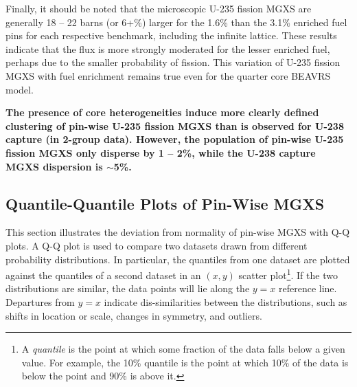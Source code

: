 Finally, it should be noted that the microscopic U-235 fission \ac{MGXS} are generally 18 -- 22 barns (or 6+\%) larger for the 1.6\% than the 3.1\% enriched fuel pins for each respective benchmark, including the infinite lattice. These results indicate that the flux is more strongly moderated for the lesser enriched fuel, perhaps due to the smaller probability of fission. This variation of U-235 fission \ac{MGXS} with fuel enrichment remains true even for the quarter core \ac{BEAVRS} model. 

\begin{emphbox}
\textbf{The presence of core heterogeneities induce more clearly defined clustering of pin-wise U-235 fission \ac{MGXS} than is observed for U-238 capture (in 2-group data). However, the population of pin-wise U-235 fission \ac{MGXS} only disperse by 1 -- 2\%, while the U-238 capture \ac{MGXS} dispersion is $\sim$5\%.}
\end{emphbox}

\subsection{Quantile-Quantile Plots of Pin-Wise MGXS}
\label{subsec:chap9-qq-plots}

This section illustrates the deviation from normality of pin-wise \ac{MGXS} with \ac{Q-Q} plots. A \ac{Q-Q} plot is used to compare two datasets drawn from different probability distributions. In particular, the quantiles from one dataset are plotted against the quantiles of a second dataset in an $(x,y)$ scatter plot\footnote{A \textit{quantile} is the point at which some fraction of the data falls below a given value. For example, the 10\% quantile is the point at which 10\% of the data is below the point and 90\% is above it.}. If the two distributions are similar, the data points will lie along the $y = x$ reference line. Departures from $y = x$ indicate dis-similarities between the distributions, such as shifts in location or scale, changes in symmetry, and outliers. 


